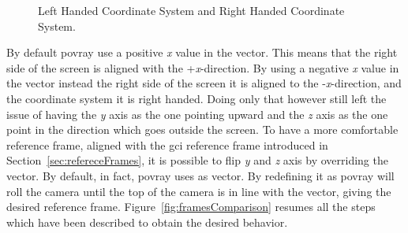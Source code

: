 \begin{figure}[htbp]
  \centering
  \qquad
  \caption{Left Handed Coordinate System and Right Handed Coordinate System.}
  \label{fig:frames}
\end{figure}

By default \acrshort{povray} use a positive \textit{x} value in the  vector. This means that the right side of the screen is aligned with the +\textit{x}-direction. By using a negative \textit{x} value in the  vector instead the right side of the screen it is aligned to the -\textit{x}-direction, and the coordinate system it is right handed. Doing only that however still left the issue of having the \textit{y} axis as the one pointing upward and the \textit{z} axis as the one point in the direction which goes outside the screen.
To have a more comfortable reference frame, aligned with the \acrshort{gci} reference frame introduced in Section~\ref{sec:refereceFrames}, it is possible to flip \textit{y} and \textit{z} axis by overriding the  vector. By default, in fact, \acrshort{povray} uses  as  vector. By redefining it as   \acrshort{povray} will roll the camera until the top of the camera is in line with the  vector, giving the desired reference frame. Figure~\ref{fig:framesComparison} resumes all the steps which have been described to obtain the desired behavior.

